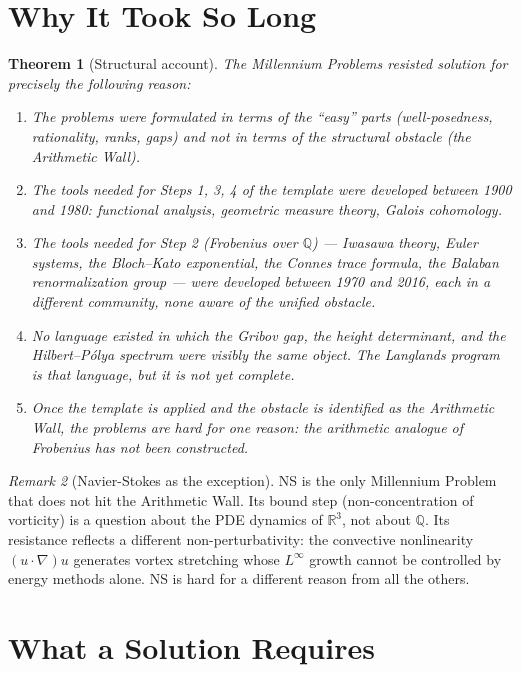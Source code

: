 \documentclass[12pt]{article}
\newtheorem{theorem}{Theorem}
\theoremstyle{definition}
\theoremstyle{remark}
\newtheorem{remark}[theorem]{Remark}
\begin{document}
\section{Why It Took So Long}

\begin{theorem}[Structural account]\label{thm:duration}
The Millennium Problems resisted solution for precisely the following reason:
\begin{enumerate}
\item The problems were formulated in terms of the ``easy'' parts
  (well-posedness, rationality, ranks, gaps) and not in terms of the
  structural obstacle (the Arithmetic Wall).
\item The tools needed for Steps 1, 3, 4 of the template were developed
  between 1900 and 1980: functional analysis, geometric measure theory,
  Galois cohomology.
\item The tools needed for Step 2 (Frobenius over $\mathbb{Q}$) --- Iwasawa
  theory, Euler systems, the Bloch--Kato exponential, the Connes trace
  formula, the Balaban renormalization group --- were developed between
  1970 and 2016, each in a different community, none aware of the unified
  obstacle.
\item No language existed in which the Gribov gap, the height determinant,
  and the Hilbert--Pólya spectrum were visibly the same object. The Langlands
  program is that language, but it is not yet complete.
\item Once the template is applied and the obstacle is identified as the
  Arithmetic Wall, the problems are hard for one reason: the arithmetic
  analogue of Frobenius has not been constructed.
\end{enumerate}
\end{theorem}

\begin{remark}[Navier-Stokes as the exception]
NS is the only Millennium Problem that does not hit the Arithmetic Wall.
Its bound step (non-concentration of vorticity) is a question about
the PDE dynamics of $\mathbb{R}^3$, not about $\mathbb{Q}$.
Its resistance reflects a different non-perturbativity: the convective
nonlinearity $(u\cdot\nabla)u$ generates vortex stretching whose
$L^\infty$ growth cannot be controlled by energy methods alone.
NS is hard for a different reason from all the others.
\end{remark}

\section{What a Solution Requires}
\end{document}
